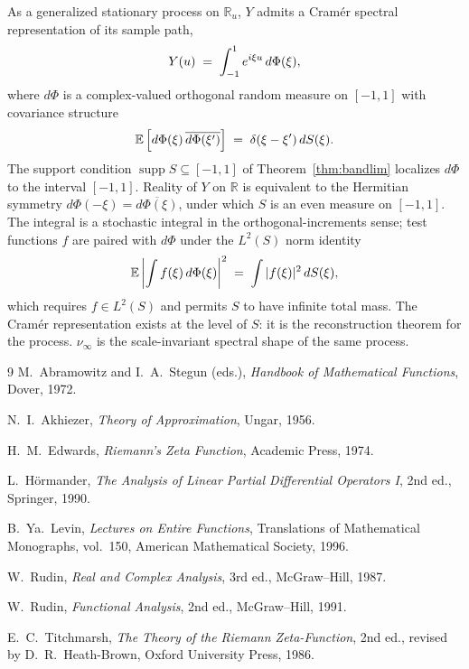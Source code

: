 \documentclass{article}
\newcommand{\tmem}[1]{{\em #1\/}}
\newcommand{\tmop}[1]{\ensuremath{\operatorname{#1}}}
\newcommand{\supp}{\tmop{supp}}
\begin{document}
As a generalized stationary process on $\mathbb{R}_u$, $Y$ admits a Cram{\'e}r
spectral representation of its sample path,
\[ Y (u) \hspace{0.27em} = \hspace{0.27em} \int_{- 1}^1 e^{i \xi u} 
   \hspace{0.17em} d \Phi (\xi), \]
where $d \Phi$ is a complex-valued orthogonal random measure on $[- 1, 1]$
with covariance structure
\[ \mathbb{E} \left[ d \Phi (\xi) \hspace{0.17em} \overline{d \Phi (\xi')}
   \right] \hspace{0.27em} = \hspace{0.27em} \delta (\xi - \xi') 
   \hspace{0.17em} dS (\xi) . \]
The support condition $\supp S \subseteq [- 1, 1]$ of
Theorem~\ref{thm:bandlim} localizes $d \Phi$ to the interval $[- 1, 1]$.
Reality of $Y$ on $\mathbb{R}$ is equivalent to the Hermitian symmetry $d \Phi
(- \xi) = \overline{d \Phi (\xi)}$, under which $S$ is an even measure on $[-
1, 1]$. The integral is a stochastic integral in the orthogonal-increments
sense; test functions $f$ are paired with $d \Phi$ under the $L^2 (S)$ norm
identity
\[ \mathbb{E} \left| \int f (\xi) \hspace{0.17em} d \Phi (\xi) \right|^2
   \hspace{0.27em} = \hspace{0.27em} \int |f (\xi) |^2  \hspace{0.17em} dS
   (\xi), \]
which requires $f \in L^2 (S)$ and permits $S$ to have infinite total mass.
The Cram{\'e}r representation exists at the level of $S$: it is the
reconstruction theorem for the process. $\nu_{\infty}$ is the scale-invariant
spectral shape of the same process.

\begin{thebibliography}{9}
  {}M.~Abramowitz and I.~A.~Stegun (eds.),
  {\tmem{Handbook of Mathematical Functions}}, Dover, 1972.
  
  {}N.~I.~Akhiezer, {\tmem{Theory of Approximation}}, Ungar,
  1956.
  
  {}H.~M.~Edwards, {\tmem{Riemann's Zeta Function}}, Academic
  Press, 1974.
  
  {}L.~H{\"o}rmander, {\tmem{The Analysis of Linear Partial
  Differential Operators I}}, 2nd ed., Springer, 1990.
  
  {}B.~Ya.~Levin, {\tmem{Lectures on Entire Functions}},
  Translations of Mathematical Monographs, vol.~150, American Mathematical
  Society, 1996.
  
  {}W.~Rudin, {\tmem{Real and Complex Analysis}}, 3rd ed.,
  McGraw--Hill, 1987.
  
  {}W.~Rudin, {\tmem{Functional Analysis}}, 2nd ed.,
  McGraw--Hill, 1991.
  
  {}E.~C.~Titchmarsh, {\tmem{The Theory of the Riemann
  Zeta-Function}}, 2nd ed., revised by D.~R.~Heath-Brown, Oxford University
  Press, 1986.
\end{thebibliography}
\end{document}
